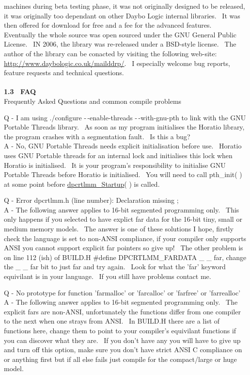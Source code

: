 \documentclass{article}
\begin{document}
machines
during beta testing phase, it was not originally designed to be
released,
it was originally too dependant on other Daybo Logic internal
libraries.~
It was then offered for download for free and a fee for the advanced
features.~
Eventually the whole source was open sourced under the GNU General
Public
License.~ IN 2006, the library was re-released under a BSD-style
license.~ The author of the library can be conacted by visiting
the following web-site: \href{http://www.daybologic.co.uk/mailddrp/}{\url{http://www.daybologic.co.uk/mailddrp/}}.~
I especially welcome bug reports, feature requests and technical
questions.\\
\\
\textbf{1.3~ FAQ}
\\
Frequently Asked Questions and common
compile problems
\par Q - I am using ./configure -$\,$-enable-threads -$\,$-with-gnu-pth to link
with the GNU Portable Threads library.~ As soon as my program
initialises the Horatio library, the program crashes with a
segmentation fault.~ Is this a bug?\\
A - No, GNU Portable Threads needs explicit initialisation before
use.~ Horatio uses GNU Portable threads for an internal lock and
initialises this lock when Horatio is initialised.~ It is your
program's responsibility to initialise GNU Portable Threads before
Horatio is initialised.~ You will need to call pth\_init( ) at
some point before \href{#Startup}{dpcrtlmm\_Startup}( ) is called.\\

\par Q - Error dpcrtlmm.h (line number): Declaration missing ;
\\
A - The following answer applies to 16-bit segmented programming
only.~ This only happens if you selected to have explict far data
for the 16-bit tiny, small
or medium memory models.~ The answer is one of these solutions I
hope,
firstly check the language is set to non-ANSI compliance, if your
compiler
only supports ANSI you cannot support explicit far pointers so give
up!~
The other problem is on line 112 (ish) of BUILD.H \#define
DPCRTLMM\_FARDATA
\_ \_ far, change the \_ \_ far bit to just far and try again.~ Look
for
what the 'far' keyword equivilant is in your language.~ If you
still
have problems contact me.

\par Q - No prototype for function 'farmalloc' or 'farcalloc' or
'farfree'
or 'farrealloc'
\\
A - The following answer applies to 16-bit segmented programming
only.~ The explicit fars are non-ANSI, unfortunately the functions
differ
from one compiler to the next when one strays from ANSI.~ In
BUILD.H
there are a list of functions here, change them to point to your
compiler's
equivilant functions if you can discover what they are.~ If you
don't
have any you will have to give up and turn off this option, make sure
you
don't have strict ANSI C compliance on or anything first but if all
else
fails just compile for the compact/large or huge model.
\end{document}
